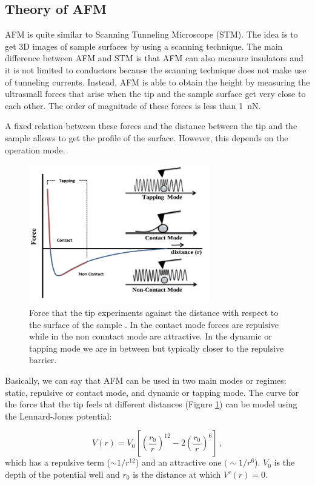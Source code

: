 \documentclass[11pt,a4paper]{article}
\begin{document}
\subsection{Theory of AFM}

AFM is quite similar to Scanning Tunneling Microscope (STM). The idea is to get 3D images of sample surfaces by using a scanning technique. The main difference between AFM and STM is that AFM can also measure insulators and it is not limited to conductors because the scanning technique does not make use of tunneling currents. Instead, AFM is able to obtain the height by measuring the ultrasmall forces that arise when the tip and the sample surface get very close to each other. The order of magnitude of these forces is less than \SI{1}{\nano\N}.

A fixed relation between these forces and the distance between the tip and the sample allows to get the profile of the surface. However, this depends on the operation mode.

\begin{figure}[ht]
\centering
\includegraphics[width=0.7\textwidth]{AFM_modes}
\caption{Force that the tip experiments against the distance with respect to the surface of the sample \cite{jfb8010007}. In the contact mode forces are repulsive while in the non conntact mode are attractive. In the dynamic or tapping mode we are in between but typically closer to the repulsive barrier.}
\label{fig:AFM_modes}
\end{figure}

Basically, we can say that AFM can be used in two main modes or regimes: static, repulsive or contact mode, and dynamic or tapping mode. The curve for the force that the tip feels at different distances (Figure \ref{fig:AFM_modes}) can be model using the Lennard-Jones potential:

\begin{equation}\label{eq:LJ}
V(r)=V_0\left[\left(\frac{r_0}{r}\right)^{12}-2\left(\frac{r_0}{r}\right)^6\right]\,,
\end{equation}
which has a repulsive term ($\sim1/r^{12}$) and an attractive one $(\sim1/r^6$). $V_0$ is the depth of the potential well and $r_0$ is the distance at which $V'(r)=0$.
\end{document}
